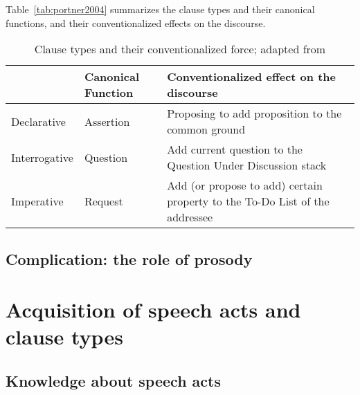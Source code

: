 Table~\ref{tab:portner2004} summarizes the clause types and their canonical functions, and their conventionalized effects on the discourse.

\begin{table}[H]
\begin{center}
\begin{tabular}{l|l|p{8cm}} 
\hline 
& Canonical Function & Conventionalized effect on the discourse \\
\hline
Declarative & Assertion & Proposing to add proposition to the common ground \\ 
\hline
Interrogative & Question & Add current question to the Question Under Discussion stack \\
\hline
Imperative & Request & Add (or propose to add) certain property to the To-Do List of the addressee \\ 
\hline
\end{tabular} 
\end{center}
\caption{Clause types and their conventionalized force; adapted from \textcite[p.238]{portner2004}}
\label{tab:intro:portner2004}
\end{table}%



\subsection{Complication: the role of prosody}
\label{sec:bg:theory:prosody}


\section{Acquisition of speech acts and clause types}
\subsection{Knowledge about speech acts}

